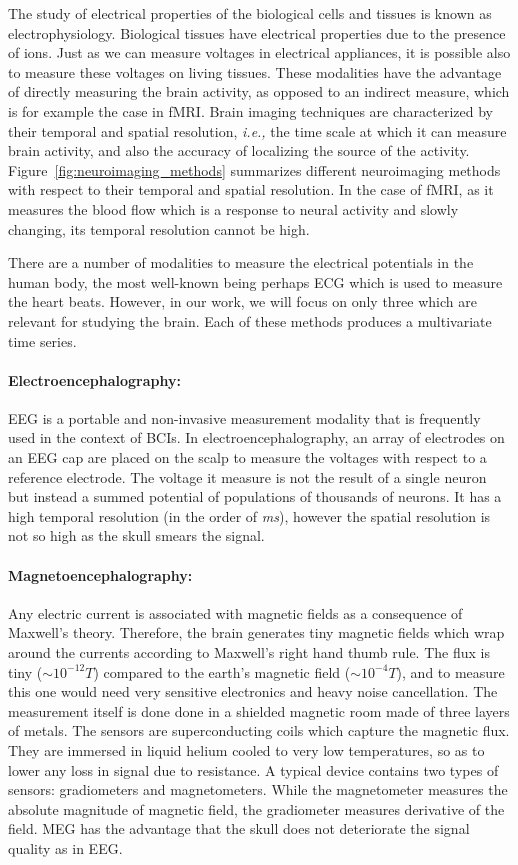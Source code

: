 The study of electrical properties of the biological cells and tissues is known as electrophysiology. Biological tissues have electrical properties due to the presence of ions. Just as we can measure voltages in electrical appliances, it is possible also to measure these voltages on living tissues. These modalities have the advantage of directly measuring the brain activity, as opposed to an indirect measure, which is for example the case in \ac{fMRI}.
Brain imaging techniques are characterized by their temporal and spatial resolution, \textit{i.e.,} the time scale at which it can measure brain activity, and also the accuracy of localizing the source of the activity. Figure~\ref{fig:neuroimaging_methods} summarizes different neuroimaging methods with respect to their temporal and spatial resolution. In the case of \ac{fMRI}, as it measures the blood flow which is a response to neural activity and slowly changing, its temporal resolution cannot be high. 

There are a number of modalities to measure the electrical potentials in the human body, the most well-known being perhaps \ac{ECG} which is used to measure the heart beats. However, in our work, we will focus on only three which are relevant for studying the brain. Each of these methods produces a multivariate time series.

\paragraph{Electroencephalography: } \Ac{EEG} is a portable and non-invasive measurement modality that is frequently used in the context of \acp{BCI}. In electroencephalography, an array of electrodes on an \ac{EEG} cap are placed on the scalp to measure the voltages with respect to a reference electrode. The voltage it measure is not the result of a single neuron but instead a summed potential of populations of thousands of neurons. It has a high temporal resolution (in the order of \emph{ms}), however the spatial resolution is not so high as the skull smears the signal.

\paragraph{Magnetoencephalography: } Any electric current is associated with magnetic fields as a consequence of Maxwell's theory. 
Therefore, the brain generates tiny magnetic fields which  wrap around the currents according to Maxwell's right hand thumb rule. The flux is tiny ($\sim10^{-12}T$) compared to the earth's magnetic field ($\sim10^{-4}T$), and to measure this one would need very sensitive electronics and heavy noise cancellation. The measurement itself is done done in a shielded magnetic room made of three layers of metals. The sensors are superconducting coils which capture the magnetic flux. They are immersed in liquid helium cooled to very low temperatures, so as to lower any loss in signal due to resistance. A typical device contains two types of sensors: gradiometers and magnetometers. While the magnetometer measures the absolute magnitude of magnetic field, the gradiometer measures derivative of the field. \Ac{MEG} has the advantage that the skull does not deteriorate the signal quality as in \ac{EEG}.

